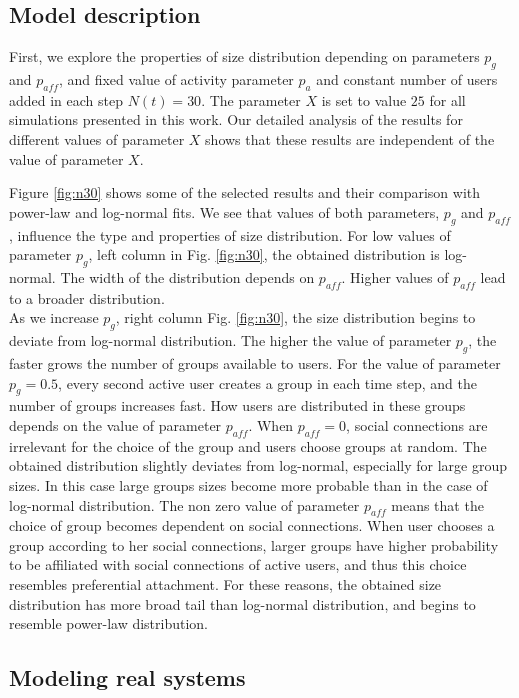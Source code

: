 \subsection{Model description}
First, we explore the properties of size distribution depending on parameters $p_{g}$ and $p_{aff}$, and fixed value of activity parameter $p_{a}$ and constant number of users added in each step $N(t)=30$. The parameter $X$ is set to value $25$ for all simulations presented in this work. Our detailed analysis of the results for different values of parameter $X$ shows that these results are independent of the value of parameter $X$.


Figure \ref{fig:n30} shows some of the selected results and their comparison with power-law and log-normal fits. We see that values of both parameters, $p_g$ and $p_{aff}$, influence the type and properties of size distribution. For low values of parameter $p_{g}$, left column in Fig. \ref{fig:n30}, the obtained distribution is log-normal. The width of the distribution depends on $p_{aff}$. Higher values of $p_{aff}$ lead to a broader distribution.\\
As we increase $p_{g}$, right column Fig. \ref{fig:n30}, the size distribution begins to deviate from
log-normal distribution. The higher the value of parameter $p_{g}$, the faster grows the number of groups available to users. For the value of parameter $p_{g}=0.5$, every second active user creates a group in each time step, and the number of groups increases fast. How users are distributed in these groups depends on the value of parameter $p_{aff}$. When $p_{aff}=0$, social connections are irrelevant for the choice of the group and users choose groups at random. The obtained distribution slightly deviates from log-normal, especially for large group sizes. In this case large groups sizes become more probable than in the case of log-normal distribution. The non zero value of parameter $p_{aff}$ means that the choice of group becomes dependent on social connections. When user chooses a group according to her social connections, larger groups have higher probability to be affiliated with social connections of active users, and thus this choice resembles preferential attachment. For these reasons, the obtained size distribution has more broad tail than log-normal distribution, and begins to resemble power-law distribution.\\ 

\subsection{Modeling real systems}

